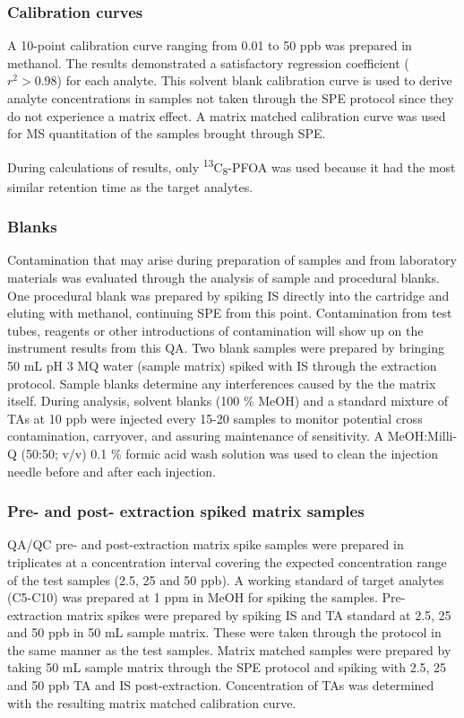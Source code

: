 \subsubsection{Calibration curves}
A 10-point calibration curve ranging from 0.01 to 50 ppb was prepared in methanol. The results demonstrated a satisfactory regression coefficient ($r^2 > 0.98$) for each analyte. This solvent blank calibration curve is used to derive analyte concentrations in samples not taken through the SPE protocol since they do not experience a matrix effect. A matrix matched calibration curve was used for MS quantitation of the samples brought through SPE. 

During calculations of results, only \textsuperscript{13}C\textsubscript{8}-PFOA was used because it had the most similar retention time as the target analytes. 


\subsubsection{Blanks}
Contamination that may arise during preparation of samples and from laboratory materials was evaluated through the analysis of sample and procedural blanks. One procedural blank was prepared by spiking IS directly into the cartridge and eluting with methanol, continuing SPE from this point. Contamination from test tubes, reagents or other introductions of contamination will show up on the instrument results from this QA. Two blank samples were prepared by bringing 50 mL pH 3 MQ water (sample matrix) spiked with IS through the extraction protocol. Sample blanks determine any interferences caused by the the matrix itself. During analysis, solvent blanks (100 \% MeOH) and a standard mixture of TAs at 10 ppb were injected every 15-20 samples to monitor potential cross contamination, carryover, and assuring maintenance of sensitivity. A MeOH:Milli-Q (50:50; v/v) 0.1 \% formic acid wash solution was used to clean the injection needle before and after each injection.

\subsubsection{Pre- and post- extraction spiked matrix samples}
QA/QC pre- and post-extraction matrix spike samples were prepared in triplicates at a concentration interval covering the expected concentration range of the test samples (2.5, 25 and 50 ppb). A working standard of target analytes (C5-C10) was prepared at 1 ppm in MeOH for spiking the samples. Pre-extraction matrix spikes were prepared by spiking IS and TA standard at 2.5, 25 and 50 ppb in 50 mL sample matrix. These were taken through the protocol in the same manner as the test samples. Matrix matched samples were prepared by taking 50 mL sample matrix through the SPE protocol and spiking with 2.5, 25 and 50 ppb TA and IS post-extraction. Concentration of TAs was determined with the resulting matrix matched calibration curve. 

